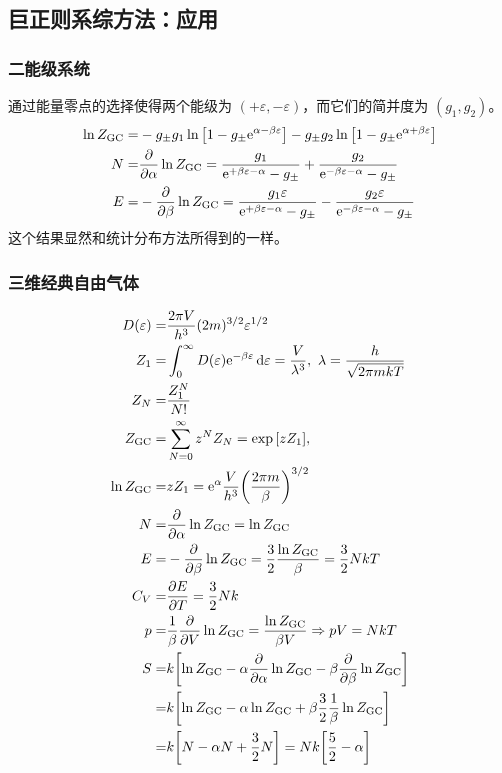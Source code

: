 \subsection{巨正则系综方法：应用}

\subsubsection{二能级系统}

通过能量零点的选择使得两个能级为 $(+ \varepsilon, - \varepsilon)$，而它们的简并度为 $(g_1, g_2)$。\begin{align*}
    \ln{Z_{\text{GC}}} = & - g_{\pm} g_1 \ln \qty[1 - g_{\pm} \mathrm{e}^{\alpha - \beta \varepsilon}] - g_{\pm} g_2 \ln \qty[1 - g_{\pm} \mathrm{e}^{\alpha + \beta \varepsilon}]\\
    N = & \pdv{\alpha} \ln{Z_{\text{GC}}} = \frac{g_1}{\mathrm{e}^{+ \beta \varepsilon - \alpha} - g_{\pm}} + \frac{g_2}{\mathrm{e}^{- \beta \varepsilon - \alpha} - g_{\pm}}\\
    E = & - \pdv{\beta} \ln{Z_{\text{GC}}} = \frac{g_1 \varepsilon}{\mathrm{e}^{+ \beta \varepsilon - \alpha} - g_{\pm}} - \frac{g_2 \varepsilon}{\mathrm{e}^{- \beta \varepsilon - \alpha} - g_{\pm}}
\end{align*}
这个结果显然和统计分布方法所得到的一样。

\subsubsection{三维经典自由气体}

\begin{align*}
    D(\varepsilon) = & \frac{2 \pi V}{h^3} (2 m)^{3/2} \varepsilon^{1/2}\\
    Z_1 = & \int_0^{\infty} D(\varepsilon) \mathrm{e}^{- \beta \varepsilon} \dd{\varepsilon} = \frac{V}{\lambda^3},\ \lambda = \frac{h}{\sqrt{2 \pi m k T}}\\
    Z_N = & \frac{Z_1^N}{N!}\\
    Z_{\text{GC}} = & \sum_{N = 0}^{\infty} z^N Z_N = \exp \qty[z Z_1],\\
    \ln{Z_{\text{GC}}} = & z Z_1 = \mathrm{e}^{\alpha} \frac{V}{h^3} \qty(\frac{2 \pi m}{\beta})^{3/2}\\
    N = & \pdv{\alpha} \ln{Z_{\text{GC}}} = \ln{Z_{\text{GC}}}\\
    E = & - \pdv{\beta} \ln{Z_{\text{GC}}} = \frac{3}{2} \frac{\ln{Z_{\text{GC}}}}{\beta} = \frac{3}{2} N k T\\
    C_V = & \pdv{E}{T} = \frac{3}{2} N k\\
    p = & \frac{1}{\beta} \pdv{V} \ln{Z_{\text{GC}}} = \frac{\ln{Z_{\text{GC}}}}{\beta V} \Rightarrow p V = N k T\\
    S = & k \qty[\ln{Z_{\text{GC}}} - \alpha \pdv{\alpha} \ln{Z_{\text{GC}}} - \beta \pdv{\beta} \ln{Z_{\text{GC}}}]\\
    = & k \qty[\ln{Z_{\text{GC}}} - \alpha \ln{Z_{\text{GC}}} + \beta \frac{3}{2} \frac{1}{\beta} \ln{Z_{\text{GC}}}]\\
    = & k \qty[N - \alpha N +\frac{3}{2} N] = N k \qty[\frac{5}{2} - \alpha]
\end{align*}

